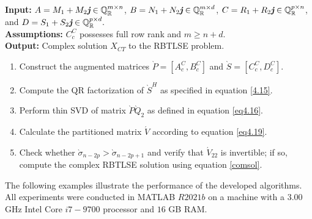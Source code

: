\documentclass[preprint,11pt,3p]{elsarticle}
\def \QR{\mathbb{Q}_\mathbb{R}}
\def \j{\textit{\textbf{j}}}
\begin{document}
\begin{algorithm} [H]
	\caption{For complex solution of RBTLSE problem}\label{alg1}
	\textbf{Input:} $A= M_1+ M_2\j \in \QR^{m \times n}$, $B= N_1+ N_2\j \in \QR^{m \times d}$, $C= R_1+ R_2\j \in  \QR^{p \times n}$, and $D= S_1+ S_2\j \in \QR^{p \times d}.$ \\
	\textbf{Assumptions:} $C^C_c$ possesses full row rank and $m \geq n+d$.\\
	\textbf{Output:} Complex solution $X_{CT}$ to the RBTLSE problem.
	\begin{enumerate}
		\item Construct the augmented matrices $\grave{P} = [A^C_c, B^C_c]$ and $\grave{S} = [C^C_c, D^C_c]$.
		\item Compute the QR factorization of $\grave{S}^H$ as specified in equation \eqref{4.15}.
		\item Perform thin SVD of matrix $\grave{P}\grave{Q}_2$ as defined in equation \eqref{eq4.16}.
		\item Calculate the partitioned matrix $\acute{V}$ according to equation \eqref{eq4.19}.
		\item Check whether $\grave{\sigma}_{n-2p} > \grave{\sigma}_{n-2p+1}$ and verify that $\acute{V}_{22}$ is invertible; if so, compute the complex RBTLSE solution using equation \eqref{comsol}.
     \end{enumerate}
	\vspace{-0.2cm}
\end{algorithm}
The following examples illustrate the performance of the developed algorithms. All experiments were conducted in MATLAB $R2021b$ on a machine with a $3.00$ GHz Intel Core $i7-9700$ processor and $16$ GB RAM.
\end{document}
